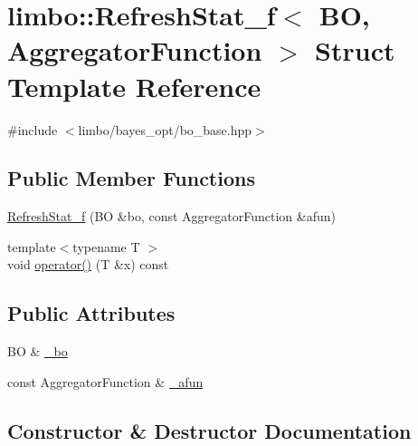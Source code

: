 \hypertarget{structlimbo_1_1_refresh_stat__f}{}\section{limbo\+:\+:Refresh\+Stat\+\_\+f$<$ BO, Aggregator\+Function $>$ Struct Template Reference}
\label{structlimbo_1_1_refresh_stat__f}


{\ttfamily \#include $<$limbo/bayes\+\_\+opt/bo\+\_\+base.\+hpp$>$}

\subsection*{Public Member Functions}
\begin{DoxyCompactItemize}
\item 
\hyperlink{structlimbo_1_1_refresh_stat__f_aa457d1c9101974999487052fddec098c}{Refresh\+Stat\+\_\+f} (BO \&bo, const Aggregator\+Function \&afun)
\item 
{\footnotesize template$<$typename T $>$ }\\void \hyperlink{structlimbo_1_1_refresh_stat__f_a24498c1e97e8aa89a8180422a3ad9109}{operator()} (T \&x) const 
\end{DoxyCompactItemize}
\subsection*{Public Attributes}
\begin{DoxyCompactItemize}
\item 
BO \& \hyperlink{structlimbo_1_1_refresh_stat__f_ad94ccf3c46dbed8e9f8ab573af8fb258}{\+\_\+bo}
\item 
const Aggregator\+Function \& \hyperlink{structlimbo_1_1_refresh_stat__f_af02fdc84a4066c199d26e823b9887531}{\+\_\+afun}
\end{DoxyCompactItemize}


\subsection{Constructor \& Destructor Documentation}
